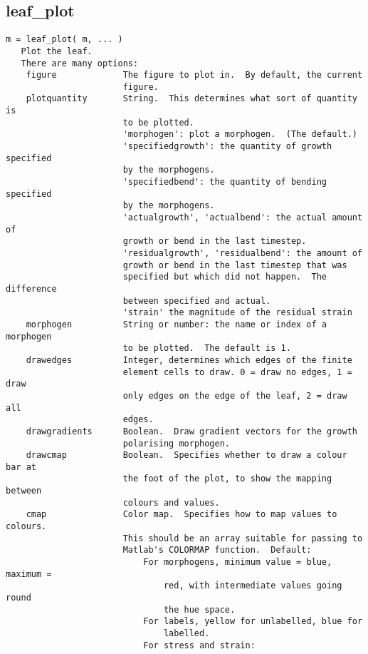 \subsection{leaf\_plot}\label{section-leaf-plot}

\begin{verbatim}
m = leaf_plot( m, ... )
   Plot the leaf.
   There are many options:
    figure             The figure to plot in.  By default, the current
                       figure.
    plotquantity       String.  This determines what sort of quantity is
                       to be plotted.
                       'morphogen': plot a morphogen.  (The default.)
                       'specifiedgrowth': the quantity of growth specified
                       by the morphogens.
                       'specifiedbend': the quantity of bending specified
                       by the morphogens.
                       'actualgrowth', 'actualbend': the actual amount of
                       growth or bend in the last timestep.
                       'residualgrowth', 'residualbend': the amount of
                       growth or bend in the last timestep that was
                       specified but which did not happen.  The difference
                       between specified and actual.
                       'strain' the magnitude of the residual strain
    morphogen          String or number: the name or index of a morphogen
                       to be plotted.  The default is 1.
    drawedges          Integer, determines which edges of the finite
                       element cells to draw. 0 = draw no edges, 1 = draw
                       only edges on the edge of the leaf, 2 = draw all
                       edges.
    drawgradients      Boolean.  Draw gradient vectors for the growth
                       polarising morphogen.
    drawcmap           Boolean.  Specifies whether to draw a colour bar at
                       the foot of the plot, to show the mapping between
                       colours and values.
    cmap               Color map.  Specifies how to map values to colours.
                       This should be an array suitable for passing to
                       Matlab's COLORMAP function.  Default:
                           For morphogens, minimum value = blue, maximum =
                               red, with intermediate values going round
                               the hue space.
                           For labels, yellow for unlabelled, blue for
                               labelled.
                           For stress and strain:

\end{verbatim}
